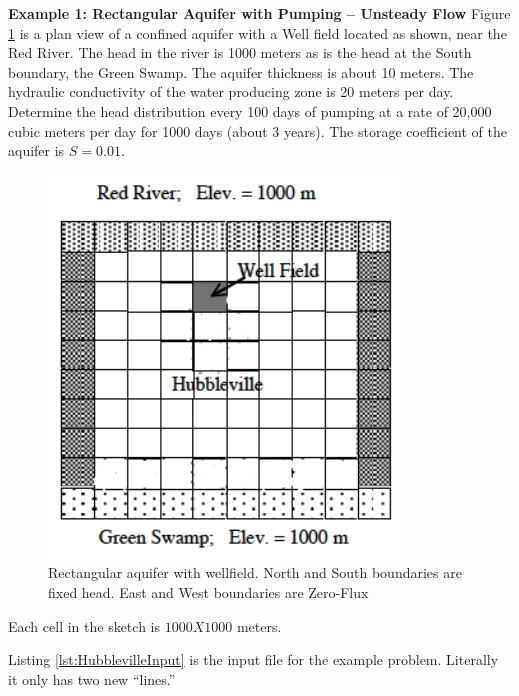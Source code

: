 \textbf{Example 1: Rectangular Aquifer with Pumping -- Unsteady Flow}
Figure \ref{fig:Hubbleville} is a plan view of a confined aquifer with a Well field located as shown, near the Red River.
The head in the river is 1000 meters as is the head at the South boundary, the Green Swamp.
The aquifer thickness is about 10 meters.
The hydraulic conductivity of the water producing zone is 20 meters per day.
Determine the head distribution every 100 days of pumping at a rate of 20,000 cubic meters per day for 1000 days (about 3 years).
The storage coefficient of the aquifer is $S=0.01$.
\begin{figure}[h!] %
   \centering
   \includegraphics[height=4in]{./18-UnsteadyGroundwaterFlow/Hubbleville.jpg} 
   \caption{Rectangular aquifer with wellfield.  North and South boundaries are fixed head.  East and West boundaries are Zero-Flux}
   \label{fig:Hubbleville}
\end{figure}

Each cell in the sketch is $1000 X 1000$ meters.

Listing \ref{lst:HubblevilleInput} is the input file for the example problem.  
Literally it only has two new ``lines.''

